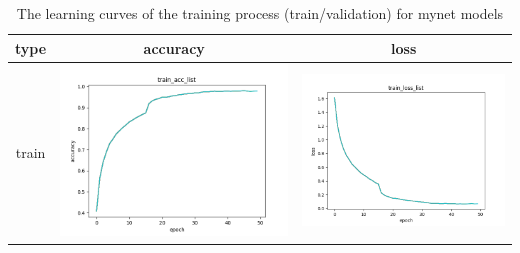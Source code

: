 \documentclass[a4paper, 12pt]{article}
\begin{document}
\begin{table}[!htb]
    \centering
    \caption{The learning curves of the training process (train/validation) for mynet models}
    \begin{tabular}{|c|c|c|}
        \hline
        type & accuracy & loss \\
        \hline
        train &\includegraphics[scale=0.5]{p2/experiment/mynet_2024_04_14_21_58_22_sgd_pre_da/log/train_acc_list.png} & \includegraphics[scale=0.5]{p2/experiment/mynet_2024_04_14_21_58_22_sgd_pre_da/log/train_loss_list.png} \\
        \hline

\end{tabular}
\end{table}
\end{document}
